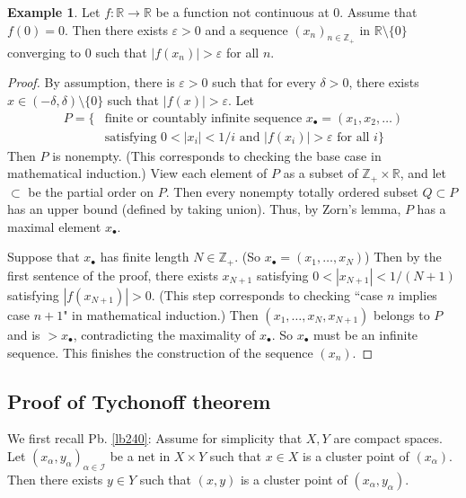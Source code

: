 \documentclass[12pt,b5paper,notitlepage]{article}
\theoremstyle{definition}
\newtheorem{eg}[df]{Example}
\theoremstyle{plain}
\newcommand{\scr}{\mathscr}
\newcommand{\blt}{\bullet}
\newcommand{\Zbb}{\mathbb Z}
\newcommand{\Rbb}{\mathbb R}
\newcommand{\eps}{\varepsilon}
\numberwithin{equation}{section}
\begin{document}
\begin{eg}
Let $f:\Rbb\rightarrow\Rbb$ be a function not continuous at $0$. Assume that $f(0)=0$.  Then there exists $\eps>0$ and a sequence $(x_n)_{n\in\Zbb_+}$ in $\Rbb\setminus\{0\}$ converging to $0$ such that $|f(x_n)|>\eps$ for all $n$.
\end{eg}



\begin{proof}
By assumption, there is $\eps>0$ such that for every $\delta>0$, there exists $x\in(-\delta,\delta)\setminus\{0\}$ such that $|f(x)|>\eps$. Let
\begin{align*}
P=\{&\text{finite or countably infinite sequence }x_\blt=(x_1,x_2,\dots)\\
&\text{satisfying }0<|x_i|<1/i\text{ and }|f(x_i)|>\eps\text{ for all }i\}
\end{align*}
Then $P$ is nonempty. (This corresponds to checking the base case in mathematical induction.) View each element of $P$ as a subset of $\Zbb_+\times\Rbb$, and let $\subset$ be the partial order on $P$. Then every nonempty totally ordered subset $Q\subset P$ has an upper bound (defined by taking union). Thus, by Zorn's lemma, $P$ has a maximal element $x_\blt$.

Suppose that $x_\blt$ has finite length $N\in\Zbb_+$. (So $x_\blt=(x_1,\dots,x_N)$) Then by the first sentence of the proof, there exists $x_{N+1}$ satisfying $0<|x_{N+1}|<1/(N+1)$ satisfying $|f(x_{N+1})|>0$. (This step corresponds to checking ``case $n$ implies case $n+1$" in mathematical induction.) Then $(x_1,\dots,x_N,x_{N+1})$ belongs to $P$ and is $>x_\blt$, contradicting the maximality of $x_\blt$. So $x_\blt$ must be an infinite sequence. This finishes the construction of the sequence $(x_n)$.
\end{proof}




\subsection{Proof of Tychonoff theorem}\label{lb503}





We first recall Pb. \ref{lb240}: Assume for simplicity that $X,Y$ are compact spaces. Let $(x_\alpha,y_\alpha)_{\alpha\in\scr I}$ be a net in $X\times Y$ such that $x\in X$ is a cluster point of $(x_\alpha)$. Then there exists $y\in Y$ such that $(x,y)$ is a cluster point of $(x_\alpha,y_\alpha)$.
\end{document}
